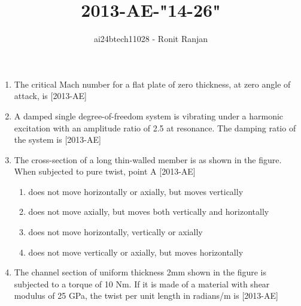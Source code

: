 \documentclass[journal,12pt,onecolumn]{IEEEtran}
\theoremstyle{remark}
\begin{document}

\vspace{3cm}

\title{2013-AE-"14-26"}
\author{ai24btech11028 - Ronit Ranjan}
\maketitle
\bigskip


\begin{enumerate}
    \item The critical Mach number for a flat plate of zero thickness, at zero angle of attack, is \underline{\hspace{2cm}}  \hfill{[2013-AE]}

    \item A damped single degree-of-freedom system is vibrating under a harmonic excitation with an amplitude ratio of 2.5 at resonance. The damping ratio of the system is \underline{\hspace{2cm}} \hfill{[2013-AE]}

    \item The cross-section of a long thin-walled member is as shown in the figure. When subjected to pure twist, point A  \hfill{[2013-AE]}
    
    \begin{figure}[!ht]
    \centering
    \label{fig:my_label}
    \end{figure}
    \begin{enumerate}
        \item does not move horizontally or axially, but moves vertically 
        \item does not move axially, but moves both vertically and horizontally
        \item does not move horizontally, vertically or axially
        \item does not move vertically or axially, but moves horizontally
    \end{enumerate} 

    \item The channel section of uniform thickness 2mm shown in the figure is subjected to a torque of 10 Nm. If it is made of a material with shear modulus of 25 GPa, the twist per unit length in radians/m is \underline{\hspace{2cm}} \hfill{[2013-AE]}
    \begin{figure}[!ht]
    \centering


\end{figure}
\end{enumerate}
\end{document}
